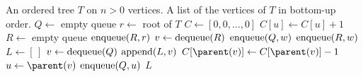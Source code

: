 
\begin{algorithmic}[1]
\Require An ordered tree $T$ on $n > 0$ vertices.
\Ensure A list of the vertices of $T$ in bottom-up order.
\State $Q \gets$ empty queue
\State $r \gets$ root of $T$
\State $C \gets [0, 0, \dots, 0]$\label{alg:bottom_up_traversal:children_count}
  \State $C[u] \gets C[u] + 1$\label{alg:bottom_up_traversal:children_count_end}
\EndFor
\State $R \gets$ empty queue\label{alg:bottom_up_traversal:empty_queue_R}
\State $\operatorname*{enqueue}(R, r)$
  \State $v \gets \operatorname*{dequeue}(R)$
      \State $\operatorname*{enqueue}(Q, w)$
    \Else
      \State $\operatorname*{enqueue}(R, w)$\label{alg:bottom_up_traversal:enqueue_R_w}
    \EndIf
  \EndFor
\EndWhile
\State $L \gets [\,]$\label{alg:bottom_up_traversal:empty_list_L}
  \State $v \gets \operatorname*{dequeue}(Q)$
  \State $\operatorname*{append}(L, v)$
    \State $C[\parent(v)] \gets C[\parent(v)] - 1$
      \State $u \gets \parent(v)$
      \State $\operatorname*{enqueue}(Q, u)$\label{alg:bottom_up_traversal:enqueue_Q_u}
    \EndIf
  \EndIf
\EndWhile
\State \Return $L$
\end{algorithmic}
